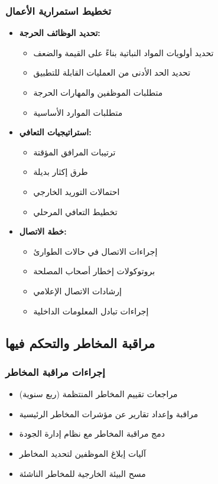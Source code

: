 \subsubsection{تخطيط استمرارية الأعمال}
\begin{itemize}
    \item \textbf{تحديد الوظائف الحرجة:}
    \begin{itemize}
        \item تحديد أولويات المواد النباتية بناءً على القيمة والضعف
        \item تحديد الحد الأدنى من العمليات القابلة للتطبيق
        \item متطلبات الموظفين والمهارات الحرجة
        \item متطلبات الموارد الأساسية
    \end{itemize}
    
    \item \textbf{استراتيجيات التعافي:}
    \begin{itemize}
        \item ترتيبات المرافق المؤقتة
        \item طرق إكثار بديلة
        \item احتمالات التوريد الخارجي
        \item تخطيط التعافي المرحلي
    \end{itemize}
    
    \item \textbf{خطة الاتصال:}
    \begin{itemize}
        \item إجراءات الاتصال في حالات الطوارئ
        \item بروتوكولات إخطار أصحاب المصلحة
        \item إرشادات الاتصال الإعلامي
        \item إجراءات تبادل المعلومات الداخلية
    \end{itemize}
\end{itemize}

\subsection{مراقبة المخاطر والتحكم فيها}

\subsubsection{إجراءات مراقبة المخاطر}
\begin{itemize}
    \item مراجعات تقييم المخاطر المنتظمة (ربع سنوية)
    \item مراقبة وإعداد تقارير عن مؤشرات المخاطر الرئيسية
    \item دمج مراقبة المخاطر مع نظام إدارة الجودة
    \item آليات إبلاغ الموظفين لتحديد المخاطر
    \item مسح البيئة الخارجية للمخاطر الناشئة
\end{itemize}

